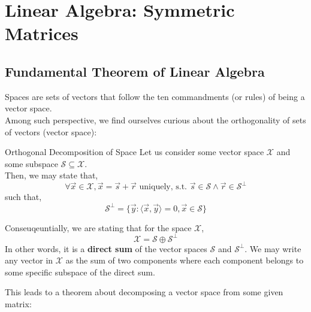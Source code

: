 \chapter{Linear Algebra: Symmetric Matrices}

\section{Fundamental Theorem of Linear Algebra}
Spaces are sets of vectors that follow the ten commandments (or rules) of being a vector space. \\
Among such perspective, we find ourselves curious about the orthogonality of sets of vectors (vector space):
\begin{ln-theorem}{Orthogonal Decomposition of Space}{}
    Let us consider some vector space $\mathcal{X}$ and some subspace $\mathcal{S} \subseteq \mathcal{X}$. \\
    Then, we may state that,
    \[\forall \vec{x} \in \mathcal{X}, \vec{x} = \vec{s} + \vec{r} \text{ uniquely, s.t. } \vec{s} \in \mathcal{S} \land \vec{r} \in \mathcal{S}^\perp\]
    such that, 
    \[\mathcal{S}^\perp = \{\vec{y} : \langle \vec{x}, \vec{y} \rangle = 0, \vec{x} \in \mathcal{S}\}\]
\end{ln-theorem}
Conseuqeuntially, we are stating that for the space $\mathcal{X}$,
\[\mathcal{X} = \mathcal{S} \oplus \mathcal{S}^\perp\]
In other words, it is a \textbf{direct sum} of the vector spaces $\mathcal{S}$ and $\mathcal{S}^\perp$.
We may write any vector in $\mathcal{X}$ as the sum of two components where each component belongs to some specific subspace of the direct sum.
\par
This leads to a theorem about decomposing a vector space from some given matrix:
